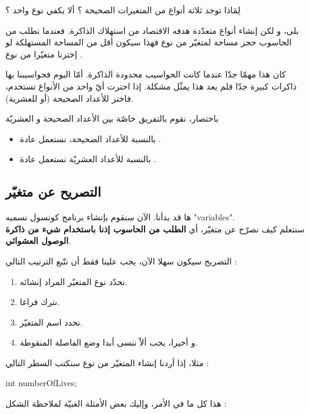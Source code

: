 \begin{question}
  لِمَاذا توجد ثلاثة أنواع من المتغيرات الصحيحة ؟ ألا يكفي نوع واحد ؟
\end{question}

بلى، و لكن إنشاء أنواع متعدّدة هدفه الاقتصاد من استهلاك الذاكرة. فعندما نطلب من الحاسوب حجز مساحة لمتغيّر من نوع
فهذا سيكون أقل من المساحة المستهلكة لو إخترنا متغيّرا من نوع
.

كان هذا مهمّا جدّا عندما كانت الحواسيب محدودة الذاكرة. أمّا اليوم فحواسيبنا بها ذاكرات كبيرة جدّا فلم يعد هذا يمثّل مشكلة. إذا احترت أيّ واحد من الأنواع تستخدم، فاختر
للأعداد الصحيحة (أو
للعشرية).

باختصار، نقوم بالتفريق خاصّة بين الأعداد الصحيحة و العشريّة
\begin{itemize}
  \item بالنسبة للأعداد الصحيحة، نستعمل عادة
.
  \item بالنسبة للأعداد العشريّة نستعمل عادة
.
\end{itemize}

\subsection{التصريح عن متغيّر}
ها قد بدأنا. الآن سنقوم بإنشاء برنامج كونسول نسميه "\textenglish{variables}".\\
 سنتعلم كيف نصرّح عن متغيّر، أي
 \textbf{الطلب من الحاسوب إذنا باستخدام شيء من ذاكرة الوصول العشوائي}.

 التصريح سيكون سهلا الآن، يجب علينا فقط أن نتّبع الترتيب التالي :
 
 \begin{enumerate}
   \item نحدّد نوع المتغيّر المراد إنشائه.
   \item نترك فراغا.
   \item نحدد اسم المتغيّر.
   \item و أخيرا، يجب ألاّ ننسى أبدا وضع الفاصلة المنقوطة.
 \end{enumerate}

 مثلا، إذا أردنا إنشاء المتغيّر
 من نوع
سنكتب السطر التالي :

\begin{Csource}
int numberOfLives;
\end{Csource}

هذا كل ما في الأمر، وإليك بعض الأمثلة الغبيّة لملاحظة الشكل :

